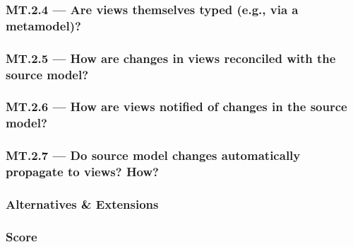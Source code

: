 \documentclass[sigconf]{acmart}
\begin{document}


\subsubsection*{MT.2.4 --- Are views themselves typed (e.g., via a metamodel)?}
\label{sec:MT2-4}



\subsubsection*{MT.2.5 --- How are changes in views reconciled with the source model?}
\label{sec:MT2-5}



\subsubsection*{MT.2.6 --- How are views notified of changes in the source model?}
\label{sec:MT2-6}



\subsubsection*{MT.2.7 --- Do source model changes automatically propagate to views? How?}
\label{sec:MT2-7}



\subsubsection*{Alternatives \& Extensions}
\label{sec:MT2-Alternatives-Extensions}


\subsubsection*{Score}
\label{sec:MT2-Score}



\end{document}
